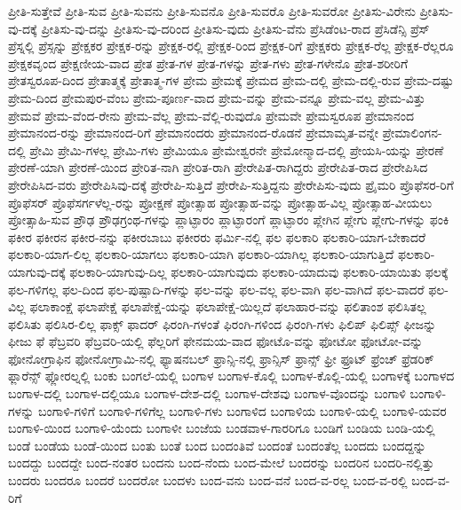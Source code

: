 {ಪ್ರೀತಿ-ಸುತ್ತೇವೆ
ಪ್ರೀತಿ-ಸುವ
ಪ್ರೀತಿ-ಸುವನು
ಪ್ರೀತಿ-ಸುವನೊ
ಪ್ರೀತಿ-ಸುವರೊ
ಪ್ರೀತಿ-ಸುವರೋ
ಪ್ರೀತಿಸು-ವಿರೇನು
ಪ್ರೀತಿಸು-ವು-ದಕ್ಕೆ
ಪ್ರೀತಿಸು-ವು-ದನ್ನು
ಪ್ರೀತಿಸು-ವು-ದರಿಂದ
ಪ್ರೀತಿಸು-ವುದು
ಪ್ರೀತಿಸು-ವೆನು
ಪ್ರೆಸಿಡೆಂಟ-ರಾದ
ಪ್ರೆಸಿಡೆನ್ಸಿ
ಪ್ರೆಸ್
ಪ್ರೆಸ್ನಲ್ಲಿ
ಪ್ರೆಸ್ಸನ್ನು
ಪ್ರೇಕ್ಷಕರ
ಪ್ರೇಕ್ಷಕ-ರನ್ನು
ಪ್ರೇಕ್ಷಕ-ರಲ್ಲಿ
ಪ್ರೇಕ್ಷಕ-ರಿಂದ
ಪ್ರೇಕ್ಷಕ-ರಿಗೆ
ಪ್ರೇಕ್ಷಕರು
ಪ್ರೇಕ್ಷಕ-ರೆಲ್ಲ
ಪ್ರೇಕ್ಷಕ-ರೆಲ್ಲರೂ
ಪ್ರೇಕ್ಷಕವೃಂದ
ಪ್ರೇಕ್ಷಣೀಯ-ವಾದ
ಪ್ರೇತ
ಪ್ರೇತ-ಗಳ
ಪ್ರೇತ-ಗಳನ್ನು
ಪ್ರೇತ-ಗಳು
ಪ್ರೇತ-ಗಳೇನೊ
ಪ್ರೇತ-ಶರೀರಿಗೆ
ಪ್ರೇತಸ್ವರೂಪ-ದಿಂದ
ಪ್ರೇತಾತ್ಮಕ್ಕೆ
ಪ್ರೇತಾತ್ಮ-ಗಳ
ಪ್ರೇಮ
ಪ್ರೇಮಕ್ಕೆ
ಪ್ರೇಮದ
ಪ್ರೇಮ-ದಲ್ಲಿ
ಪ್ರೇಮ-ದಲ್ಲಿ-ರುವ
ಪ್ರೇಮ-ದಷ್ಟು
ಪ್ರೇಮ-ದಿಂದ
ಪ್ರೇಮಪುರ-ವೆಂಬ
ಪ್ರೇಮ-ಪೂರ್ಣ-ವಾದ
ಪ್ರೇಮ-ವನ್ನು
ಪ್ರೇಮ-ವನ್ನೂ
ಪ್ರೇಮ-ವಲ್ಲ
ಪ್ರೇಮ-ವಿತ್ತು
ಪ್ರೇಮವೆ
ಪ್ರೇಮ-ವೆಂದ-ರೇನು
ಪ್ರೇಮ-ವೆಲ್ಲ
ಪ್ರೇಮ-ವೆಲ್ಲಿ-ರುವುದೊ
ಪ್ರೇಮವೇ
ಪ್ರೇಮಸ್ವರೂಪ
ಪ್ರೇಮಾನಂದ
ಪ್ರೇಮಾನಂದ-ರನ್ನು
ಪ್ರೇಮಾನಂದ-ರಿಗೆ
ಪ್ರೇಮಾನಂದರು
ಪ್ರೇಮಾನಂದ-ರೊಡನೆ
ಪ್ರೇಮಾಮೃತ-ವನ್ನೇ
ಪ್ರೇಮಾಲಿಂಗನ-ದಲ್ಲಿ
ಪ್ರೇಮಿ
ಪ್ರೇಮಿ-ಗಳಲ್ಲ
ಪ್ರೇಮಿ-ಗಳು
ಪ್ರೇಮಿಯೂ
ಪ್ರೇಮೇಶ್ವರನೇ
ಪ್ರೇಮೋನ್ಮಾದ-ದಲ್ಲಿ
ಪ್ರೇಯಸಿ-ಯನ್ನು
ಪ್ರೇರಣೆ
ಪ್ರೇರಣೆ-ಯಾಗಿ
ಪ್ರೇರಣೆ-ಯಿಂದ
ಪ್ರೇರಿತ-ನಾಗಿ
ಪ್ರೇರಿತ-ರಾಗಿ
ಪ್ರೇರೇಪಿತ-ರಾಗಿದ್ದರು
ಪ್ರೇರೇಪಿತ-ರಾದ
ಪ್ರೇರೇಪಿಸಿದ
ಪ್ರೇರೇಪಿಸಿದ-ವರು
ಪ್ರೇರೇಪಿಸಿವು-ದಕ್ಕೆ
ಪ್ರೇರೇಪಿ-ಸುತ್ತಿದೆ
ಪ್ರೇರೇಪಿ-ಸುತ್ತಿದ್ದನು
ಪ್ರೇರೇಪಿಸು-ವುದು
ಪ್ರೈಮರಿ
ಪ್ರೊಫೆಸರ-ರಿಗೆ
ಪ್ರೊಫೆಸರ್
ಪ್ರೊಫೆಸರ್ಗಳೆಲ್ಲ-ರನ್ನು
ಪ್ರೋಕ್ಷಣೆ
ಪ್ರೋತ್ಸಾಹ
ಪ್ರೋತ್ಸಾಹ-ವನ್ನು
ಪ್ರೋತ್ಸಾಹ-ವಿಲ್ಲ
ಪ್ರೋತ್ಸಾಹ-ವೀಯಲು
ಪ್ರೋತ್ಸಾಹಿ-ಸುವ
ಪ್ರೌಢ
ಪ್ರೌಢಗ್ರಂಥ-ಗಳನ್ನು
ಪ್ಲಾಟ್ಫಾರಂ
ಪ್ಲಾಟ್ಫಾರಂಗೆ
ಪ್ಲಾಟ್ಫಾರಂ
ಪ್ಲೇಗಿನ
ಪ್ಲೇಗು
ಪ್ಲೇಗು-ಗಳನ್ನು
ಫಂಕಿ
ಫಕೀರ
ಫಕೀರನ
ಫಕೀರ-ನನ್ನು
ಫಕೀರಬಾಬು
ಫಕೀರರು
ಫರ್ಮಿ-ನಲ್ಲಿ
ಫಲ
ಫಲಕಾರಿ
ಫಲಕಾರಿ-ಯಾಗ-ಬೇಕಾದರೆ
ಫಲಕಾರಿ-ಯಾಗ-ಲಿಲ್ಲ
ಫಲಕಾರಿ-ಯಾಗಲು
ಫಲಕಾರಿ-ಯಾಗಿ
ಫಲಕಾರಿ-ಯಾಗಿಲ್ಲ
ಫಲಕಾರಿ-ಯಾಗುತ್ತಿದೆ
ಫಲಕಾರಿ-ಯಾಗುವು-ದಕ್ಕೆ
ಫಲಕಾರಿ-ಯಾಗುವು-ದಿಲ್ಲ
ಫಲಕಾರಿ-ಯಾಗುವುದು
ಫಲಕಾರಿ-ಯಾದುವು
ಫಲಕಾರಿ-ಯಾಯಿತು
ಫಲಕ್ಕೆ
ಫಲ-ಗಳಿಗಲ್ಲ
ಫಲ-ದಿಂದ
ಫಲ-ಪುಷ್ಪಾದಿ-ಗಳನ್ನು
ಫಲ-ವನ್ನು
ಫಲ-ವಲ್ಲ
ಫಲ-ವಾಗಿ
ಫಲ-ವಾಗಿದೆ
ಫಲ-ವಾದರೆ
ಫಲ-ವಿಲ್ಲ
ಫಲಾಕಾಂಕ್ಷೆ
ಫಲಾಪೇಕ್ಷೆ
ಫಲಾಪೇಕ್ಷೆ-ಯನ್ನು
ಫಲಾಪೇಕ್ಷೆ-ಯಿಲ್ಲದೆ
ಫಲಾಹಾರ-ವನ್ನು
ಫಲಿತಾಂಶ
ಫಲಿಸಿತಲ್ಲ
ಫಲಿಸಿತು
ಫಲಿಸಿರ-ಲಿಲ್ಲ
ಫಾಕ್ಸ್
ಫಾದರ್
ಫಿರಂಗಿ-ಗಳಂತೆ
ಫಿರಂಗಿ-ಗಳಿಂದ
ಫಿರಂಗಿ-ಗಳು
ಫಿಲಿಪ್
ಫಿಲಿಪ್ಸ್
ಫೀಜನ್ನು
ಫೀಜು
ಫೆ
ಫೆಬ್ರವರಿ
ಫೆಬ್ರವರಿ-ಯಲ್ಲಿ
ಫೆಲ್ಲರಿಗೆ
ಫೇನಮಯ-ವಾದ
ಫೋಟೊ-ವನ್ನು
ಫೋಟೋ
ಫೋಟೋ-ವನ್ನು
ಫೋನೋಗ್ರಾಫಿನ
ಫೋನೋಗ್ರಾಮಿ-ನಲ್ಲಿ
ಫ್ಯಾಷನಬಲ್
ಫ್ರಾನ್ಸಿ-ನಲ್ಲಿ
ಫ್ರಾನ್ಸಿಸ್
ಫ್ರಾನ್ಸ್
ಫ್ರೀ
ಫ್ರೂಟ್
ಫ್ರೆಂಚ್
ಫ್ರೆಡರಿಕ್
ಫ್ಲಾರೆನ್ಸ್
ಫ್ಲೋರಲ್ನಲ್ಲಿ
ಬಂಕು
ಬಂಗಲೆ-ಯಲ್ಲಿ
ಬಂಗಾಳ
ಬಂಗಾಳ-ಕೊಲ್ಲಿ
ಬಂಗಾಳ-ಕೊಲ್ಲಿ-ಯಲ್ಲಿ
ಬಂಗಾಳಕ್ಕೆ
ಬಂಗಾಳದ
ಬಂಗಾಳ-ದಲ್ಲಿ
ಬಂಗಾಳ-ದಲ್ಲಿಯೂ
ಬಂಗಾಳ-ದೇಶ-ದಲ್ಲಿ
ಬಂಗಾಳ-ದೇಶವು
ಬಂಗಾಳ-ವೊಂದನ್ನು
ಬಂಗಾಳಿ
ಬಂಗಾಳಿ-ಗಳನ್ನು
ಬಂಗಾಳಿ-ಗಳಿಗೆ
ಬಂಗಾಳಿ-ಗಳಿಗೆಲ್ಲ
ಬಂಗಾಳಿ-ಗಳು
ಬಂಗಾಳಿದ
ಬಂಗಾಳಿಯ
ಬಂಗಾಳಿ-ಯಲ್ಲಿ
ಬಂಗಾಳಿ-ಯವರ
ಬಂಗಾಳಿ-ಯಿಂದ
ಬಂಗಾಳಿ-ಯೆಂದು
ಬಂಗಾಳೀ
ಬಂಜೆಯ
ಬಂಡವಾಳ-ಗಾರರಿಗೂ
ಬಂಡಿಗೆ
ಬಂಡಿಯ
ಬಂಡಿ-ಯಲ್ಲಿ
ಬಂಡೆ
ಬಂಡೆಯ
ಬಂಡೆ-ಯಿಂದ
ಬಂತು
ಬಂತೆ
ಬಂದ
ಬಂದಂತಿವೆ
ಬಂದಂತೆ
ಬಂದಂತೆಲ್ಲ
ಬಂದದು
ಬಂದದ್ದನ್ನು
ಬಂದದ್ದು
ಬಂದದ್ದೇ
ಬಂದ-ನಂತರ
ಬಂದನು
ಬಂದ-ನೆಂದು
ಬಂದ-ಮೇಲೆ
ಬಂದರನ್ನು
ಬಂದರಿನ
ಬಂದರಿ-ನಲ್ಲಿತ್ತು
ಬಂದರು
ಬಂದರೂ
ಬಂದರೆ
ಬಂದರೋ
ಬಂದಳು
ಬಂದ-ವನು
ಬಂದ-ವನೆ
ಬಂದ-ವ-ರಲ್ಲ
ಬಂದ-ವ-ರಲ್ಲಿ
ಬಂದ-ವ-ರಿಗೆ
}
